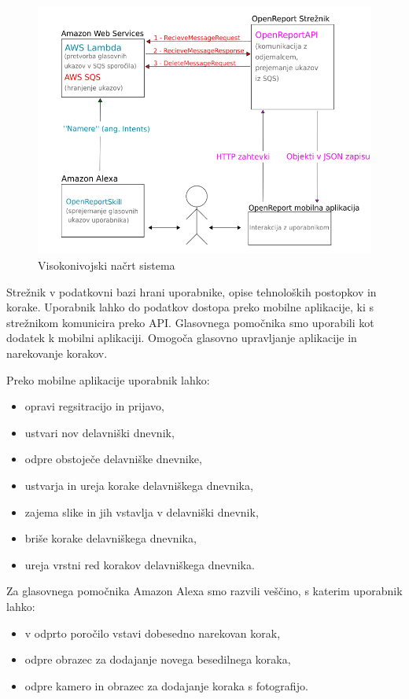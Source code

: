 \documentclass[a4paper, 12pt]{book}
\begin{document}
\begin{figure}[H]
\begin{center}
\includegraphics[width=13cm]{plan}
\end{center}
\caption{Visokonivojski načrt sistema}
\label{plan}
\end{figure}

Strežnik v podatkovni bazi hrani uporabnike, opise tehnoloških postopkov in korake.
Uporabnik lahko do podatkov dostopa preko mobilne aplikacije, ki s strežnikom komunicira preko API.
Glasovnega pomočnika smo uporabili kot dodatek k mobilni aplikaciji.
Omogoča glasovno upravljanje aplikacije in narekovanje korakov.

\bigbreak
Preko mobilne aplikacije uporabnik lahko:
\begin{itemize}
	\item opravi regsitracijo in prijavo,
	\item ustvari nov delavniški dnevnik,
	\item odpre obstoječe delavniške dnevnike,
	\item ustvarja in ureja korake delavniškega dnevnika,
	\item zajema slike in jih vstavlja v delavniški dnevnik,
	\item briše korake delavniškega dnevnika,
	\item ureja vrstni red korakov delavniškega dnevnika.
\end{itemize}

Za glasovnega pomočnika Amazon Alexa smo razvili veščino, s katerim uporabnik lahko:

\begin{itemize}
	\item v odprto poročilo vstavi dobesedno narekovan korak,
	\item odpre obrazec za dodajanje novega besedilnega koraka,
	\item odpre kamero in obrazec za dodajanje koraka s fotografijo.
\end{itemize}
\end{document}
